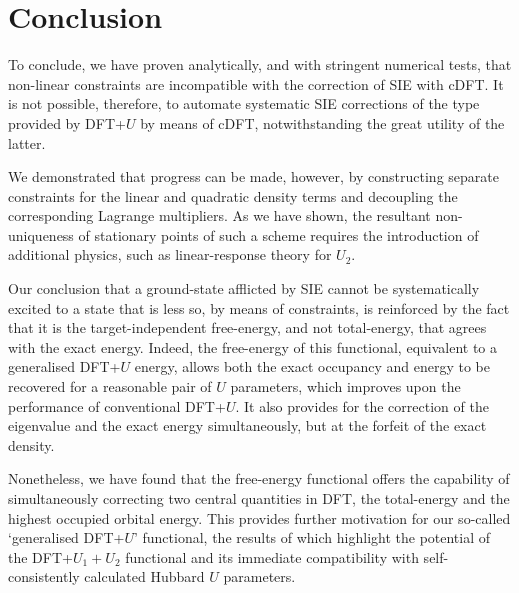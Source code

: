 \section{Conclusion}
%
To conclude, 
we have proven analytically, 
and with stringent numerical tests,
that non-linear constraints are incompatible 
with the correction of SIE with cDFT.
%
It is not possible, therefore, to automate 
systematic SIE corrections of the type 
provided by DFT+$U$ by means of cDFT, 
notwithstanding the great utility of the latter.


We demonstrated that progress can be made, however,  
by constructing separate constraints 
for the linear and quadratic density terms 
and decoupling the corresponding Lagrange multipliers.
%
As we have shown, 
the resultant non-uniqueness of stationary points 
of such a scheme requires the 
introduction of additional physics, 
such as linear-response theory for $U_2$.
%

Our conclusion that 
a ground-state afflicted by SIE cannot be systematically
excited to a state that is less so, 
by means of constraints,
is reinforced by the fact that it is 
the target-independent free-energy, 
and not total-energy, 
that agrees with the exact energy.
%
Indeed, 
the free-energy of this functional, 
equivalent to a generalised DFT+$U$ energy, 
allows both the exact occupancy and energy 
to be recovered for a reasonable pair of $U$ parameters, 
which improves upon the performance of conventional DFT+$U$.
%
It also provides for the correction of the 
eigenvalue and the exact energy simultaneously, 
but at the forfeit of the exact density.

Nonetheless, 
we have found that the free-energy functional 
offers the capability of simultaneously 
correcting two central quantities in DFT, 
the total-energy and the highest occupied orbital energy.
%
This provides further motivation 
for our so-called `generalised DFT+$U$' functional, 
the results of which highlight the potential of 
the DFT+$U_1+U_2$ functional 
and its immediate compatibility with 
self-consistently calculated Hubbard $U$ parameters.

